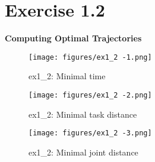 \section*{Exercise 1.2}

\textbf{Computing Optimal Trajectories}

\begin{figure*}[htbp]
    \centering
    \texttt{[image: figures/ex1\_2 -1.png]}
    \caption{ex1\_2: Minimal time}
\end{figure*}

\begin{figure*}[htbp]
    \centering
    \texttt{[image: figures/ex1\_2 -2.png]}
    \caption{ex1\_2: Minimal task distance}
\end{figure*}

\begin{figure*}[htbp]
    \centering
    \texttt{[image: figures/ex1\_2 -3.png]}
    \caption{ex1\_2: Minimal joint distance}
\end{figure*}
